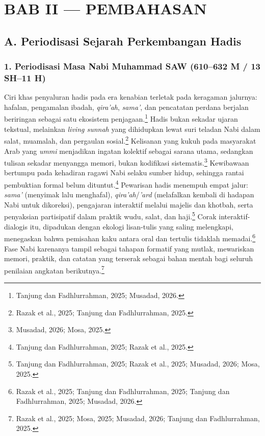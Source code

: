 
\section*{BAB II --- PEMBAHASAN}

\subsection*{A. Periodisasi Sejarah Perkembangan Hadis}

\subsubsection*{1. Periodisasi Masa Nabi Muhammad SAW (610--632 M / 13 SH--11 H)}

Ciri khas penyaluran hadis pada era kenabian terletak pada keragaman jalurnya: hafalan, pengamalan ibadah, \textit{qira'ah}, \textit{sama'}, dan pencatatan perdana berjalan beriringan sebagai satu ekosistem penjagaan.\footnote{Tanjung dan Fadhlurrahman, 2025; Musadad, 2026.} Hadis bukan sekadar ujaran tekstual, melainkan \textit{living sunnah} yang dihidupkan lewat suri teladan Nabi dalam salat, muamalah, dan pergaulan sosial.\footnote{Razak et al., 2025; Tanjung dan Fadhlurrahman, 2025.} Kelisanan yang kukuh pada masyarakat Arab yang \textit{ummi} menjadikan ingatan kolektif sebagai sarana utama, sedangkan tulisan sekadar menyangga memori, bukan kodifikasi sistematis.\footnote{Musadad, 2026; Mosa, 2025.} Kewibawaan bertumpu pada kehadiran ragawi Nabi selaku sumber hidup, sehingga rantai pembuktian formal belum dituntut.\footnote{Tanjung dan Fadhlurrahman, 2025; Razak et al., 2025.} Pewarisan hadis menempuh empat jalur: \textit{sama'} (menyimak lalu menghafal), \textit{qira'ah}/\textit{'ard} (melafalkan kembali di hadapan Nabi untuk dikoreksi), pengajaran interaktif melalui majelis dan khotbah, serta penyaksian partisipatif dalam praktik wudu, salat, dan haji.\footnote{Tanjung dan Fadhlurrahman, 2025; Razak et al., 2025; Musadad, 2026; Mosa, 2025.} Corak interaktif-dialogis itu, dipadukan dengan ekologi lisan-tulis yang saling melengkapi, menegaskan bahwa pemisahan kaku antara oral dan tertulis tidaklah memadai.\footnote{Razak et al., 2025; Tanjung dan Fadhlurrahman, 2025; Tanjung dan Fadhlurrahman, 2025; Musadad, 2026.} Fase Nabi karenanya tampil sebagai tahapan formatif yang mutlak, mewariskan memori, praktik, dan catatan yang terserak sebagai bahan mentah bagi seluruh penilaian angkatan berikutnya.\footnote{Razak et al., 2025; Mosa, 2025; Musadad, 2026; Tanjung dan Fadhlurrahman, 2025.}

